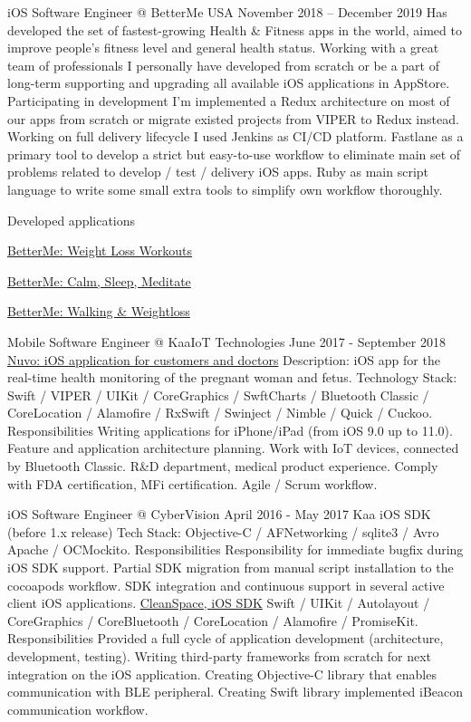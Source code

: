\documentclass{article}
\begin{document}
iOS Software Engineer @ BetterMe USA
November 2018 – December 2019
Has developed the set of fastest-growing Health \& Fitness apps in the world, aimed to improve people’s fitness level and general health status. Working with a great team of professionals I personally have developed from scratch or be a part of long-term supporting and upgrading all available iOS applications in AppStore.
Participating in development I’m implemented a Redux architecture on most of our apps from scratch or migrate existed projects from VIPER to Redux instead. Working on full delivery lifecycle I used Jenkins as CI/CD platform. Fastlane as a primary tool to develop a strict but easy-to-use workflow to eliminate main set of problems related to develop / test / delivery iOS apps. Ruby as main script language to write some small extra tools to simplify own workflow thoroughly.

Developed applications

\href{https://apps.apple.com/us/app/betterme-weight-loss-workouts/id1264546236}{BetterMe: Weight Loss Workouts}

\href{https://apps.apple.com/us/app/betterme-calm-sleep-meditate/id1363010081}{BetterMe: Calm, Sleep, Meditate}

\href{https://apps.apple.com/us/app/betterme-walking-weightloss/id1434400695}{BetterMe: Walking \& Weightloss}

Mobile Software Engineer @ KaaIoT Technologies
June 2017 - September 2018
\href{https://www.nuvocares.com/solutions}{Nuvo: iOS application for customers and doctors}
Description: iOS app for the real-time health monitoring of the pregnant woman and fetus.
Technology Stack: Swift / VIPER / UIKit / CoreGraphics / SwftCharts / Bluetooth Classic / CoreLocation / Alamofire / RxSwift / Swinject / Nimble / Quick / Cuckoo.
Responsibilities
Writing applications for iPhone/iPad (from iOS 9.0 up to 11.0).
Feature and application architecture planning.
Work with IoT devices, connected by Bluetooth Classic.
R\&D department, medical product experience.
Comply with FDA certification, MFi certification.
Agile / Scrum workflow.

iOS Software Engineer @ CyberVision
April 2016 - May 2017
Kaa iOS SDK (before 1.x release)
Tech Stack: Objective-C / AFNetworking / sqlite3 / Avro Apache / OCMockito.
Responsibilities
Responsibility for immediate bugfix during iOS SDK support.
Partial SDK migration from manual script installation to the cocoapods workflow.
SDK integration and continuous support in several active client iOS applications.
\href{https://apps.apple.com/us/app/cleanspace-air-pollution-app/id987959047}{CleanSpace, iOS SDK}
Swift / UIKit / Autolayout / CoreGraphics / CoreBluetooth / CoreLocation / Alamofire / PromiseKit.
Responsibilities
Provided a full cycle of application development (architecture, development, testing).
Writing third-party frameworks from scratch for next integration on the iOS application.
Creating Objective-C library that enables communication with BLE peripheral.
Creating Swift library implemented iBeacon communication workflow.
\end{document}
